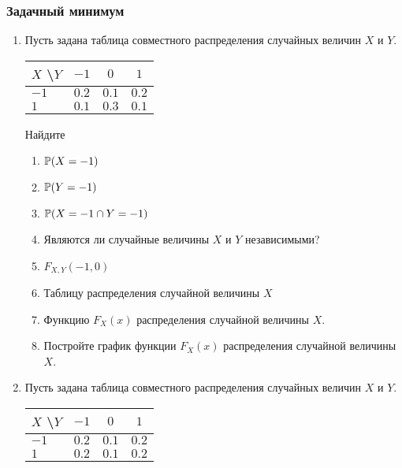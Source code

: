 \subsubsection*{Задачный минимум}


\begin{enumerate}

\item Пусть задана таблица совместного распределения случайных величин $X$ и $Y$.

\begin{center}\begin{tabular}{lccc}
\toprule
 $X$ \textbackslash $Y$    & $-1$  & $0$   & $1$   \\ \midrule
$-1$                 & $0.2$ & $0.1$ & $0.2$ \\
 $1$                 & $0.1$ & $0.3$ & $0.1$ \\ \bottomrule
\end{tabular}\end{center}


Найдите
\begin{enumerate}
\item $\P(X = -1)$
\item $\P(Y = -1)$
\item $\P(X = -1 \cap Y = -1 )$
\item Являются ли случайные величины $X$ и $Y$ независимыми?
\item $F_{X,Y}(-1,0)$
\item Таблицу распределения случайной величины $X$
\item Функцию $F_{X}(x)$ распределения случайной величины $X$.
\item Постройте график функции $F_{X}(x)$ распределения случайной величины $X$.
\end{enumerate}

\item Пусть задана таблица совместного распределения случайных величин $X$ и $Y$.


\begin{center}\begin{tabular}{lccc}
\toprule
 $X$ \textbackslash $Y$    & $-1$  & $0$  & $1$   \\ \midrule
$-1$                 & $0.2$ & $0.1$ & $0.2$ \\
 $1$                 & $0.2$ & $0.1$ & $0.2$ \\ \bottomrule
\end{tabular}\end{center}


\end{enumerate}
